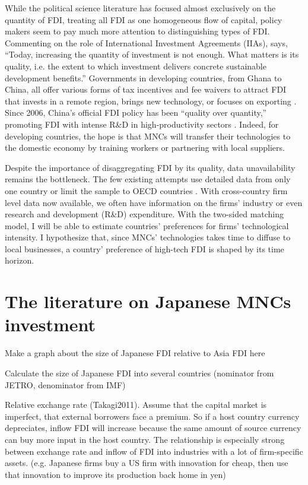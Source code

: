 While the political science literature has focused almost exclusively on the quantity of FDI, treating all FDI as one homogeneous flow of capital, policy makers seem to pay much more attention to distinguishing types of FDI. Commenting on the role of International Investment Agreements (IIAs), \citet{UNCTAD2015} says, ``Today, increasing the quantity of investment is not enough. What matters is its quality, i.e. the extent to which investment delivers concrete sustainable development benefits.'' Governments in developing countries, from Ghana to China, all offer various forms of tax incentives and fee waivers to attract FDI that invests in a remote region, brings new technology, or focuses on exporting \citep{Ricupero2000}. Since 2006, China's official FDI policy has been ``quality over quantity,'' promoting FDI with intense R\&D in high-productivity sectors \citep{Guangzhou2011}. Indeed, for developing countries, the hope is that MNCs will transfer their technologies to the domestic economy by training workers or partnering with local suppliers.

Despite the importance of disaggregating FDI by its quality, data unavailability remains the bottleneck. The few existing attempts use detailed data from only one country or limit the sample to OECD countries \citep{Alfaro2003, Alfaro2007, Javorcik2004}. With cross-country firm level data now available, we often have information on the firms' industry or even research and development (R\&D) expenditure. With the two-sided matching model, I will be able to estimate countries' preferences for firms' technological intensity. I hypothesize that, since MNCs' technologies takes time to diffuse to local businesses, a country' preference of high-tech FDI is shaped by its time horizon.

\section{The literature on Japanese MNCs investment}

Make a graph about the size of Japanese FDI relative to Asia FDI here

Calculate the size of Japanese FDI into several countries (nominator from JETRO,
denominator from IMF)

Relative exchange rate (Takagi2011). Assume that the capital market is
imperfect, that external borrowers face a premium. So if a host country currency
depreciates, inflow FDI will increase because the same amount of source currency
can buy more input in the host country. The relationship is especially strong
between exchange rate and inflow of FDI into industries with a lot of
firm-specific assets. (e.g. Japanese firms buy a US firm with innovation for
cheap, then use that innovation to improve its production back home in yen) 

